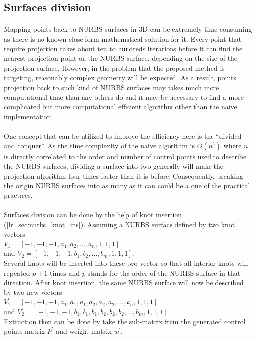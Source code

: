 \subsection{Surfaces division}
\paragraph{}
Mapping points back to NURBS surfaces in 3D can be extremely time consuming as there is no known close form mathematical solution for it.
Every point that require projection takes about ten to hundreds iterations before it can find the nearest projection point on the NURBS surface, depending on the size of the projection surface.
However, in the problem that the proposed method is targeting, reasonably complex geometry will be expected.
As a result, points projection back to such kind of NURBS surfaces may takes much more computational time than any others do and it may be necessary to find a more complicated but more computational efficient algorithm other than the naive implementation.

\paragraph{}
One concept that can be utilized to improve the efficiency here is the ``divided and conquer''.
As the time complexity of the naive algorithm is $O(n^3)$ where $n$ is directly correlated to the order and number of control points used to describe the NURBS surfaces, dividing a surface into two generally will make the projection algorithm four times faster than it is before.
Consequently, breaking the origin NURBS surfaces into as many as it can could be a one of the practical practices.

\paragraph{}
Surfaces division can be done by the help of knot insertion (\ref{lr_sec:nurbs_knot_ins}).
Assuming a NURBS surface defined by two knot vectors\\
$
V_1 = [-1, -1, -1, a_1, a_2, \dots, a_n , 1, 1, 1]
$\\
and
$
V_2 = [-1, -1, -1, b_1, b_2, \dots, b_m, 1, 1, 1]
$.\\
Several knots will be inserted into these two vector so that all interior knots will repeated $p+1$ times and $p$ stands for the order of the NURBS surface in that direction.
After knot insertion, the same NURBS surface will now be described by two new vectors\\
$
V_1^\prime = [-1, -1, -1, a_1, a_1, a_1, a_2, a_2, a_2, \dots, a_n , 1, 1, 1]
$\\
and
$
V_2^\prime = [-1, -1, -1, b_1, b_1, b_1, b_2, b_2, b_2, \dots, b_m, 1, 1, 1]
$.\\
Extraction then can be done by take the sub-matrix from the generated control points matrix $P^\prime$ and weight matrix $w^\prime$.

